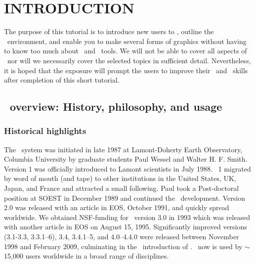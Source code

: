 \documentclass{report}
\begin{document}

\clearpage

\thispagestyle{headings}
\tableofcontents 

\chapter*{INTRODUCTION} 
\thispagestyle{headings}

The purpose of this tutorial is to introduce new users to \GMT,
outline the \GMT\ environment, and enable you to make several
forms of graphics without having to know too much about \UNIX\
and \UNIX\ tools.  We will not be able to cover all aspects of
\GMT\ nor will we necessarily cover the selected topics in
sufficient detail.  Nevertheless, it is hoped that the exposure
will prompt the users to improve their \GMT\ and \UNIX\ skills
after completion of this short tutorial.

\section*{\gmt\ overview: History, philosophy, and usage}

\subsection*{Historical highlights}

The \GMT\ system was initiated in late 1987 at Lamont-Doherty
Earth Observatory, Columbia University by graduate students Paul
Wessel and Walter H. F. Smith.  Version 1 was officially introduced
to Lamont scientists in July 1988.  \GMT\ 1 migrated by word of mouth
(and tape) to other institutions in the United States, UK, Japan, and
France and attracted a small following.  Paul took a Post-doctoral
position at SOEST in December 1989 and continued the \GMT\ development.
Version 2.0 was released with an article in EOS, October 1991, and
quickly spread worldwide.  We obtained NSF-funding for \GMT\
version 3.0 in 1993 which was released with another article in EOS
on August 15, 1995.  Significantly improved versions (3.1-3.3,
3.3.1--6), 3.4, 3.4.1--5, and 4.0--4.4.0 were released between November 1998 and
February 2009, culminating in the \GMTDOCDATE\ introduction of \GMTDOCVERSION.
\GMT\ now is used by $\sim$15,000 users worldwide in a broad range of disciplines.
\end{document}
